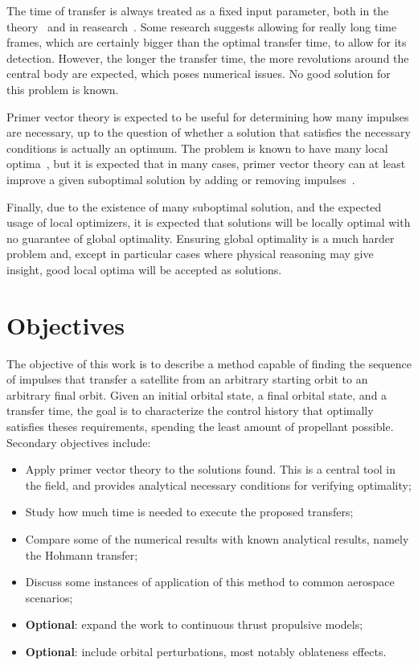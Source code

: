 The time of transfer is always treated as a fixed input parameter, both in the theory~\cite{Conway_2010} and in reasearch~\cite{fixed_time_primer_vector}. Some research suggests allowing for really long time frames, which are certainly bigger than the optimal transfer time, to allow for its detection. However, the longer the transfer time, the more revolutions around the central body are expected, which poses numerical issues. No good solution for this problem is known.

Primer vector theory is expected to be useful for determining how many impulses are necessary, up to the question of whether a solution that satisfies the necessary conditions is actually an optimum. The problem is known to have many local optima~\cite{interactive_primer_vector}, but it is expected that in many cases, primer vector theory can at least improve a given suboptimal solution by adding or removing impulses~\cite{Conway_2010}.

Finally, due to the existence of many suboptimal solution, and the expected usage of local optimizers, it is expected that solutions will be locally optimal with no guarantee of global optimality. Ensuring global optimality is a much harder problem and, except in particular cases where physical reasoning may give insight, good local optima will be accepted as solutions.

\section{Objectives}

The objective of this work is to describe a method capable of finding the sequence of impulses that transfer a satellite from an arbitrary starting orbit to an arbitrary final orbit. Given an initial orbital state, a final orbital state, and a transfer time, the goal is to characterize the control history that optimally satisfies theses requirements, spending the least amount of propellant possible. Secondary objectives include:
\begin{itemize}
    \item Apply primer vector theory to the solutions found. This is a central tool in the field, and provides analytical necessary conditions for verifying optimality;
    \item Study how much time is needed to execute the proposed transfers;
    \item Compare some of the numerical results with known analytical results, namely the Hohmann transfer;
    \item Discuss some instances of application of this method to common aerospace scenarios;
    \item \textbf{Optional}: expand the work to continuous thrust propulsive models;
    \item \textbf{Optional}: include orbital perturbations, most notably oblateness effects.
\end{itemize}

